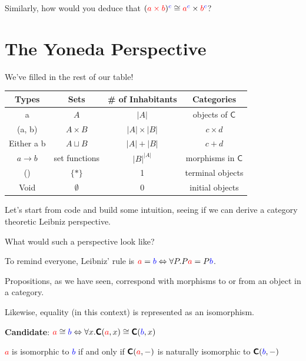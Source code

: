 \documentclass[tikz]{beamer}
\newcommand{\cat}[1]{\bm{ \mathsf{#1} }}
\newcommand{\cc}{\cat{C}}
\newcommand{\red}[1]{\textcolor{red}{#1}}
\newcommand{\mred}[1]{\textcolor{red}{$#1$}}
\newcommand{\blue}[1]{\textcolor{blue}{#1}}
\newcommand{\mblue}[1]{\textcolor{blue}{$#1$}}
\theoremstyle{definition}
\begin{document}
\frame
{
	Similarly, how would you deduce that $(\red{a \times b})^{\blue{c}} \cong \red{a}^{\blue{c}} \times \red{b}^{\blue{c}}$?
}

\section{The Yoneda Perspective}


\begin{frame}
	We've filled in the rest of our table! 	
	
	\begin{center}
		\begin{tabular}{|c|c|c|c|}
		\hline
		Types & Sets & \# of Inhabitants & Categories \\
		\hline
			a       & $A$ & $|A|$  & objects of $\cc$ \\
			(a, b) & $A \times B$ & $|A| \times |B|$ & $c \times d$ \\
			Either a b & $A \sqcup B$ & $|A| + |B|$ & $c + d$ \\
			$a \to b$ &  set functions & $|B|^{|A|}$ & morphisms in $\cc$ \\
			() & $\{*\}$ & 1 & terminal objects \\
			Void & $\emptyset$ & 0 & initial objects \\ \hline
		\end{tabular}
	\end{center}
\end{frame}

\frame
{
	Let's start from code and build some intuition, seeing if we can derive a category theoretic Leibniz perspective. 
}

\frame
{
	What would such a perspective look like? 
}

\frame
{
	To remind everyone, Leibniz' rule is $ \red{a} = \blue{b} \Leftrightarrow \forall P. P \red{a} = P \blue{b}$. 
}

\frame
{
	Propositions, as we have seen, correspond with morphisms to or from an object in a category. 
	
	Likewise, equality (in this context) is represented as an isomorphism. 
}

\frame
{
	\textbf{Candidate}: $\red{a} \cong \blue{b} \Leftrightarrow \forall x. \cc(\red{a}, x) \cong \cc(\blue{b}, x)$
}

\frame
{
	\begin{definition}
		\mred{a} is isomorphic to \mblue{b} if and only if $\cc(\red{a}, -)$ is naturally isomorphic to  $\cc(\blue{b}, -)$
	\end{definition}
	
}
\end{document}
